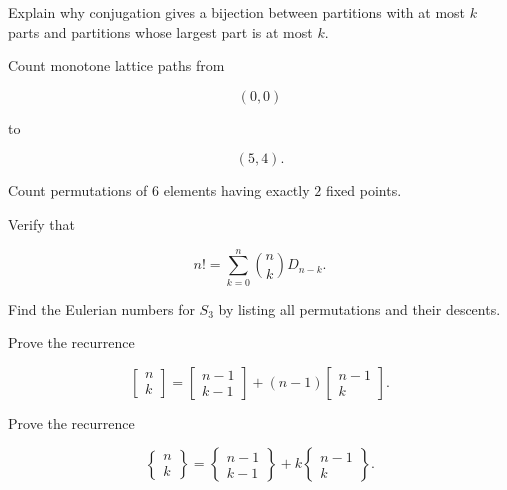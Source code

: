 \begin{exercise}[2]
Explain why conjugation gives a bijection between partitions with at
most \(k\) parts and partitions whose largest part is at most \(k\).
\end{exercise}

\begin{exercise}[2]
Count monotone lattice paths from

\[
(0,0)
\]

to

\[
(5,4).
\]
\end{exercise}

\begin{exercise}[2]
Count permutations of \(6\) elements having exactly \(2\) fixed points.
\end{exercise}

\begin{exercise}[2]
Verify that

\[
n!
=
\sum_{k=0}^{n}
\binom{n}{k}D_{n-k}.
\]
\end{exercise}

\begin{exercise}[2]
Find the Eulerian numbers for \(S_3\) by listing all permutations and
their descents.
\end{exercise}

\begin{exercise}[3]
Prove the recurrence

\[
\left[
\begin{matrix}
n\\
k
\end{matrix}
\right]
=
\left[
\begin{matrix}
n-1\\
k-1
\end{matrix}
\right]
+
(n-1)
\left[
\begin{matrix}
n-1\\
k
\end{matrix}
\right].
\]
\end{exercise}

\begin{exercise}[3]
Prove the recurrence

\[
\left\{
\begin{matrix}
n\\
k
\end{matrix}
\right\}
=
\left\{
\begin{matrix}
n-1\\
k-1
\end{matrix}
\right\}
+
k
\left\{
\begin{matrix}
n-1\\
k
\end{matrix}
\right\}.
\]
\end{exercise}

